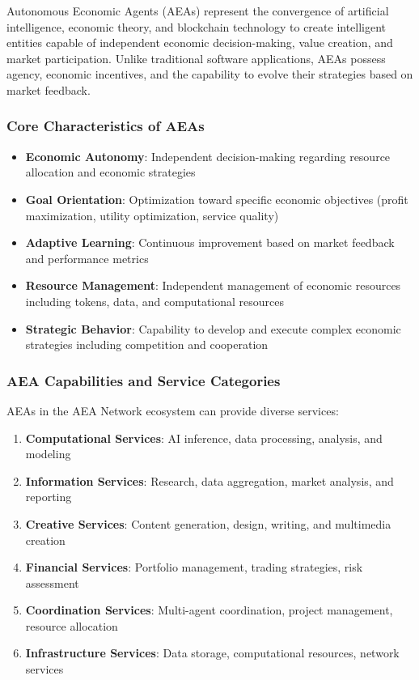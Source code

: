\documentclass[12pt,a4paper]{article}
\begin{document}
Autonomous Economic Agents (AEAs) represent the convergence of artificial intelligence, economic theory, and blockchain technology to create intelligent entities capable of independent economic decision-making, value creation, and market participation. Unlike traditional software applications, AEAs possess agency, economic incentives, and the capability to evolve their strategies based on market feedback.

\subsubsection{Core Characteristics of AEAs}

\begin{itemize}
\item \textbf{Economic Autonomy}: Independent decision-making regarding resource allocation and economic strategies
\item \textbf{Goal Orientation}: Optimization toward specific economic objectives (profit maximization, utility optimization, service quality)
\item \textbf{Adaptive Learning}: Continuous improvement based on market feedback and performance metrics
\item \textbf{Resource Management}: Independent management of economic resources including tokens, data, and computational resources
\item \textbf{Strategic Behavior}: Capability to develop and execute complex economic strategies including competition and cooperation
\end{itemize}

\subsubsection{AEA Capabilities and Service Categories}

AEAs in the AEA Network ecosystem can provide diverse services:

\begin{enumerate}
\item \textbf{Computational Services}: AI inference, data processing, analysis, and modeling
\item \textbf{Information Services}: Research, data aggregation, market analysis, and reporting
\item \textbf{Creative Services}: Content generation, design, writing, and multimedia creation
\item \textbf{Financial Services}: Portfolio management, trading strategies, risk assessment
\item \textbf{Coordination Services}: Multi-agent coordination, project management, resource allocation
\item \textbf{Infrastructure Services}: Data storage, computational resources, network services
\end{enumerate}
\end{document}
